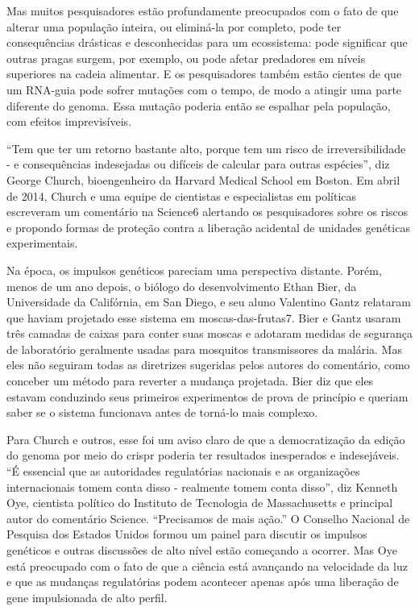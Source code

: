 \documentclass{report}
\begin{document}
Mas muitos pesquisadores estão profundamente preocupados com o fato de que alterar uma população inteira, ou eliminá-la por completo, pode ter consequências drásticas e desconhecidas para um ecossistema: pode significar que outras pragas surgem, por exemplo, ou pode afetar predadores em níveis superiores na cadeia alimentar. E os pesquisadores também estão cientes de que um RNA-guia pode sofrer mutações com o tempo, de modo a atingir uma parte diferente do genoma. Essa mutação poderia então se espalhar pela população, com efeitos imprevisíveis.

“Tem que ter um retorno bastante alto, porque tem um risco de irreversibilidade - e consequências indesejadas ou difíceis de calcular para outras espécies”, diz George Church, bioengenheiro da Harvard Medical School em Boston. Em abril de 2014, Church e uma equipe de cientistas e especialistas em políticas escreveram um comentário na Science6 alertando os pesquisadores sobre os riscos e propondo formas de proteção contra a liberação acidental de unidades genéticas experimentais.

Na época, os impulsos genéticos pareciam uma perspectiva distante. Porém, menos de um ano depois, o biólogo do desenvolvimento Ethan Bier, da Universidade da Califórnia, em San Diego, e seu aluno Valentino Gantz relataram que haviam projetado esse sistema em moscas-das-frutas7. Bier e Gantz usaram três camadas de caixas para conter suas moscas e adotaram medidas de segurança de laboratório geralmente usadas para mosquitos transmissores da malária. Mas eles não seguiram todas as diretrizes sugeridas pelos autores do comentário, como conceber um método para reverter a mudança projetada. Bier diz que eles estavam conduzindo seus primeiros experimentos de prova de princípio e queriam saber se o sistema funcionava antes de torná-lo mais complexo.

Para Church e outros, esse foi um aviso claro de que a democratização da edição do genoma por meio do \ac{crispr} poderia ter resultados inesperados e indesejáveis. “É essencial que as autoridades regulatórias nacionais e as organizações internacionais tomem conta disso - realmente tomem conta disso”, diz Kenneth Oye, cientista político do Instituto de Tecnologia de Massachusetts e principal autor do comentário Science. “Precisamos de mais ação.” O Conselho Nacional de Pesquisa dos Estados Unidos formou um painel para discutir os impulsos genéticos e outras discussões de alto nível estão começando a ocorrer. Mas Oye está preocupado com o fato de que a ciência está avançando na velocidade da luz e que as mudanças regulatórias podem acontecer apenas após uma liberação de gene impulsionada de alto perfil.
\end{document}
